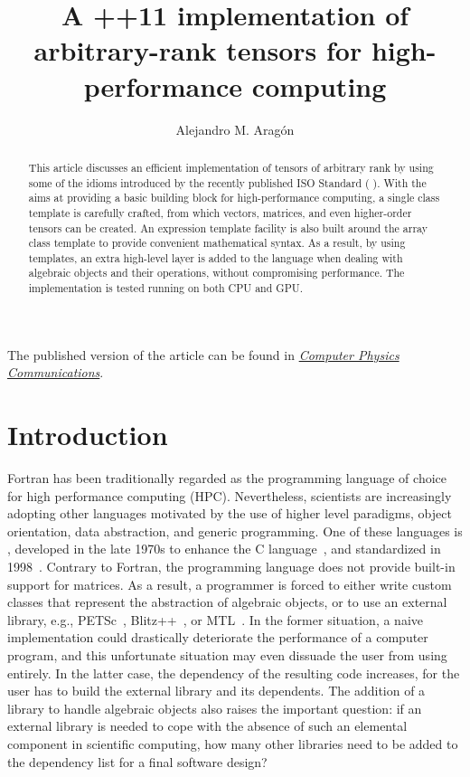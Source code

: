 \documentclass[11pt]{article}
\title{A \C++11 implementation of arbitrary-rank tensors for high-performance computing}
\author{Alejandro M. Arag\'{o}n}
\date{}
\def\ifmonospace{\ifdim\fontdimen3\font=0pt }
\def\C++{\ifmonospace C++\else C\kern-.1667em\raise.50ex\hbox{\tiny{\textbf{+}\kern-.1em\textbf{+}}}\fi \spacefactor1000 }
\def\CPP11{\ifmonospace C++11\else C\kern-.1667em\raise.50ex\hbox{\tiny{\textbf{+}\kern-.1em\textbf{+}}}\kern-.1em11\fi \spacefactor1000 }
\newcommand{\code}[1]{{\footnotesize\ttfamily{#1}}}
\begin{document}
\maketitle


The published version of the article can be found in \href{http://dx.doi.org/10.1016/j.cpc.2014.01.005}{\emph{Computer Physics Communications}}.


\begin{abstract}

This article discusses an efficient implementation of tensors of arbitrary rank
by using some of the idioms introduced by the recently published \C++ ISO Standard (\CPP11). 
With the aims at providing a basic building block for high-performance computing,
a single \code{Array} class template is carefully crafted, from which vectors, matrices, and even higher-order tensors can be created.
An expression template facility is also built around the array class template to provide convenient mathematical syntax.
As a result, by using templates, an extra high-level layer is added to the \C++ language when dealing with algebraic objects and their operations, without compromising performance. The implementation is tested running on both CPU and GPU.
\end{abstract}



\section{Introduction} \label{sec:intro}

Fortran has been traditionally regarded as the programming language of choice for high performance computing (HPC). Nevertheless, scientists are increasingly adopting other languages motivated by the use of higher level paradigms, object orientation, data abstraction, and generic programming. One of these languages is \C++, developed in the late 1970s to enhance the C language~\cite{C99}, and standardized in 1998~\cite{C++98}.
Contrary to Fortran, the \C++ programming language does not provide built-in support for matrices.
As a result, a programmer is forced to either write custom classes that represent the abstraction of algebraic objects, or to use an external library, e.g., PETSc~\cite{PETSc}, Blitz++~\cite{Veldhuizen:1998}, or MTL~\cite{Siek:1998, Gottschling:2007}. 
In the former situation, a naive implementation could drastically deteriorate the performance of a computer program, and this unfortunate situation may even dissuade the user from using \C++ entirely.
In the latter case, the dependency of the resulting code increases, for the user has to build the external library and its dependents.
The addition of a library to handle algebraic objects also raises the important question: if an external library is needed to cope with the absence of such an elemental component in scientific computing, how many other libraries need to be added to the dependency list for a final software design?
\end{document}
